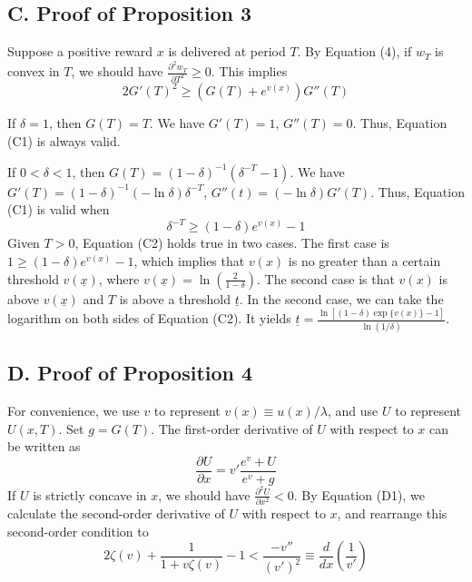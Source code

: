 \hypertarget{c.-proof-of-proposition-3}{%
\subsection*{C. Proof of Proposition
3}\label{c.-proof-of-proposition-3}}

Suppose a positive reward \(x\) is delivered at period \(T\). By
Equation (4), if \(w_T\) is convex in \(T\), we should have
\(\frac{\partial^2 w_T}{\partial T^2}\geq 0\). This
implies\[\tag{C1} 2G'(T)^2\geq(G(T)+e^{v(x)})G''(T) \]

If \(\delta=1\), then \(G(T)=T\). We have \(G'(T)=1\), \(G''(T)=0\).
Thus, Equation (C1) is always valid.

If \(0<\delta<1\), then \(G(T)=(1-\delta)^{-1}(\delta^{-T}-1)\). We have
\(G'(T)=(1-\delta)^{-1}(-\ln\delta)\delta^{-T}\),
\(G''(t)=(-\ln\delta)G'(T)\). Thus, Equation (C1) is valid when
\[\tag{C2} \delta^{-T}\geq(1-\delta)e^{v(x)}-1 \]Given \(T>0\), Equation
(C2) holds true in two cases. The first case is
\(1\geq (1-\delta)e^{v(x)}-1\), which implies that \(v(x)\) is no
greater than a certain threshold \(v(\underline{x})\), where
\(v(\underline{x})=\ln(\frac{2}{1-\delta})\). The second case is that
\(v(x)\) is above \(v(\underline{x})\) and \(T\) is above a threshold
\(\underline{t}\). In the second case, we can take the logarithm on both
sides of Equation (C2). It yields
\(\underline{t}=\frac{\ln[(1-\delta)\exp\{v(x)\}-1]}{\ln(1/\delta)}\).

\hypertarget{d.-proof-of-proposition-4}{%
\subsection*{D. Proof of Proposition
4}\label{d.-proof-of-proposition-4}}

For convenience, we use \(v\) to represent \(v(x)\equiv u(x)/\lambda\),
and use \(U\) to represent \(U(x,T)\). Set \(g= G(T)\). The first-order
derivative of \(U\) with respect to \(x\) can be written as\[\tag{D1}
\frac{\partial U}{\partial x}=v'\frac{e^v+U}{e^v+g}
\]If \(U\) is strictly concave in \(x\), we should have
\(\frac{\partial^2 U}{\partial x^2}<0\). By Equation (D1), we calculate
the second-order derivative of \(U\) with respect to \(x\), and
rearrange this second-order condition to\[\tag{D2}
2\zeta(v)+\frac{1}{1+v\zeta(v)}-1<\frac{-v''}{(v')^2}\equiv\frac{d}{dx}\left(\frac{1}{v'}\right)
\]

